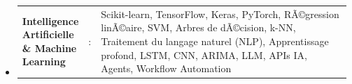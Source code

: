 ﻿\documentclass{article}
\newcommand{\resumeSectionType}[3]{
  \item\begin{tabular*}{0.96\textwidth}[t]{
    p{0.15\linewidth}p{0.02\linewidth}p{0.81\linewidth}
  }
    \textbf{#1} & #2 & #3
  \end{tabular*}\vspace{-2pt}
}
\begin{document}
\begin{itemize}
\resumeSectionType{Intelligence Artificielle \& Machine Learning}{:}{Scikit-learn, TensorFlow, Keras, PyTorch, RÃ©gression linÃ©aire, SVM, Arbres de dÃ©cision, k-NN, Traitement du langage naturel (NLP), Apprentissage profond, LSTM, CNN, ARIMA, LLM, APIs IA, Agents, Workflow Automation}
\end{itemize}
\end{document}
